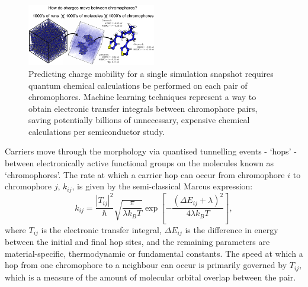 \documentclass[12pt]{article}
\begin{document}
\begin{figure}\centering
	\includegraphics[width=0.5\textwidth]{Figures/fig.png}
    \caption{Predicting charge mobility for a single simulation snapshot requires quantum chemical calculations be performed on each pair of chromophores. Machine learning techniques represent a way to obtain electronic transfer integrals between chromophore pairs, saving potentially billions of unnecessary, expensive chemical calculations per semiconductor study.}
	\label{fig:fig1}
\end{figure}

Carriers move through the morphology via quantised tunnelling events - `hops' - between electronically active functional groups on the molecules known as `chromophores'.
The rate at which a carrier hop can occur from chromophore $i$ to chromophore $j$, $k_{ij}$, is given by the semi-classical Marcus expression\cite{Marcus1964}:
\begin{equation}\label{eq:Marcus}
    k_{ij} = \frac{\left| T_{ij} \right|^{2}}{\hbar} \sqrt{\frac{\pi}{\lambda k_{B} T}} \exp \left[ - \frac{(\Delta E_{ij} + \lambda)^{2}}{4 \lambda k_{B} T} \right],
\end{equation}
where $T_{ij}$ is the electronic transfer integral, $\Delta E_{ij}$ is the difference in energy between the initial and final hop sites, and the remaining parameters are material-specific, thermodynamic or fundamental constants.
The speed at which a hop from one chromophore to a neighbour can occur is primarily governed by $T_{ij}$, which is a measure of the amount of molecular orbital overlap between the pair.
\end{document}

